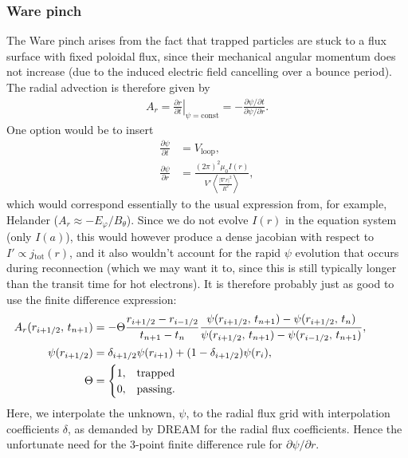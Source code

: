 \documentclass[11pt,a4paper]{article}
\newcommand{\sub}[1]{\ensuremath{_{\text{#1}}}}
\begin{document}
\subsubsection*{Ware pinch}
The Ware pinch arises from the fact that trapped particles are stuck to a flux surface with fixed poloidal flux, since their mechanical angular momentum does not increase (due to the induced electric field cancelling over a bounce period). The radial advection is therefore given by
\begin{align}
A_r = \left. \frac{\partial r}{\partial t} \right|_{\psi=\mathrm{const}} = -\frac{\partial \psi/\partial t}{\partial \psi/\partial r}.
\end{align}
One option would be to insert 
\begin{align}
\frac{\partial \psi}{\partial t} &= V\sub{loop}, \nonumber \\
\frac{\partial \psi}{\partial r} &= \frac{(2\pi)^2\mu_0 I(r) }{V'\left\langle\frac{|\nabla r|^2}{R^2}\right\rangle},
\end{align}
which would correspond essentially to the usual expression from, for example, Helander ($A_r \approx -E_\varphi/B_\theta$).
Since we do not evolve $I(r)$ in the equation system (only $I(a)$), this would however produce a dense jacobian with respect to $I' \propto  j\sub{tot}(r)$, and it also wouldn't account for the rapid $\psi$ evolution that occurs during reconnection (which we may want it to, since this is still typically longer than the transit time for hot electrons).
It is therefore probably just as good to use the finite difference expression:
\begin{align}
\hspace{-15mm} A_r(r_{i+1/2}, \,t_{n+1}) &= -\Theta \frac{r_{i+1/2} - r_{i-1/2}}{t_{n+1} - t_n} \frac{  \psi(r_{i+1/2}, \,t_{n+1}) - \psi(r_{i+1/2},\,t_n)}{\psi(r_{i+1/2}, \,t_{n+1})-\psi(r_{i-1/2},\,t_{n+1})}, \nonumber \\
\psi(r_{i+1/2}) &= \delta_{i+1/2} \psi(r_{i+1}) + (1-\delta_{i+1/2})\psi(r_i), \nonumber \\
\Theta &= \begin{cases}
1, & \text{trapped} \\
0, & \text{passing}.
\end{cases}
\end{align}
Here, we interpolate the unknown, $\psi$, to the radial flux grid with interpolation coefficients $\delta$, as demanded by DREAM for the radial flux coefficients. Hence the unfortunate need for the 3-point finite difference rule for $\partial \psi/\partial r$.
\end{document}
